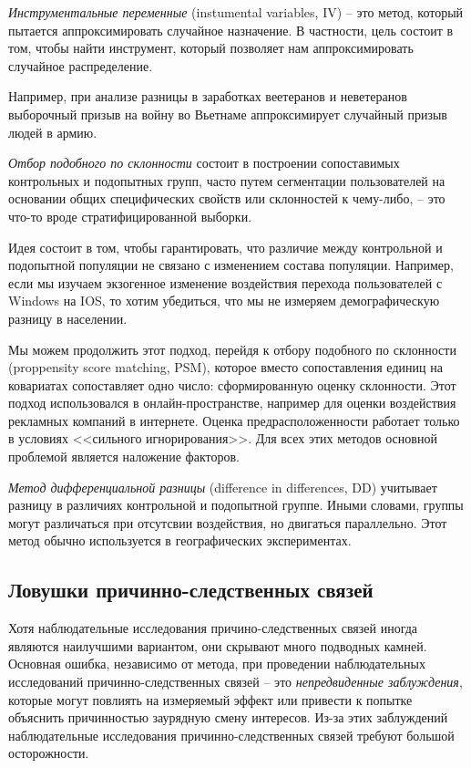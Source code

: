 \documentclass[%
	11pt,
	a4paper,
	utf8,
		]{article}
\begin{document}
\emph{Инструментальные переменные} (instumental variables, IV) -- это метод, который пытается аппроксимировать случайное назначение. В частности, цель состоит в том, чтобы найти инструмент, который позволяет нам аппроксимировать случайное распределение.

Например, при анализе разницы в заработках веетеранов и неветеранов выборочный призыв на войну во Вьетнаме аппроксимирует случайный призыв людей в армию.

\emph{Отбор подобного по склонности} состоит в построении сопоставимых контрольных и подопытных групп, часто путем сегментации пользователей на основании общих специфических свойств или склонностей к чему-либо, -- это что-то вроде стратифицированной выборки.

Идея состоит в том, чтобы гарантировать, что различие между контрольной и подопытной популяции не связано с изменением состава популяции. Например, если мы изучаем экзогенное изменение воздействия перехода пользователей с Windows на IOS, то хотим убедиться, что мы не измеряем демографическую разницу в населении. 

Мы можем продолжить этот подход, перейдя к отбору подобного по склонности (proppensity score matching, PSM), которое вместо сопоставления единиц на ковариатах сопоставляет одно число: сформированную оценку склонности. Этот подход использовался в онлайн-пространстве, например для оценки воздействия рекламных компаний в интернете. Оценка предрасположенности работает только в условиях <<сильного игнорирования>>. Для всех этих методов основной проблемой является наложение факторов.
 
\emph{Метод дифференциальной разницы} (difference in differences, DD) учитывает разницу в различиях контрольной и подопытной группе. Иными словами, группы могут различаться при отсутсвии воздействия, но двигаться параллельно. Этот метод обычно используется в географических экспериментах.

\subsection{Ловушки причинно-следственных связей}

Хотя наблюдательные исследования причино-следственных связей иногда являются наилучшими вариантом, они скрывают много подводных камней. Основная ошибка, независимо от метода, при проведении наблюдательных исследований причинно-следственных связей -- это \emph{непредвиденные заблуждения}, которые могут повлиять на измеряемый эффект или привести к попытке объяснить причинностью заурядную смену интересов. Из-за этих заблуждений наблюдательные исследования причинно-следственных связей требуют большой осторожности.
\end{document}
